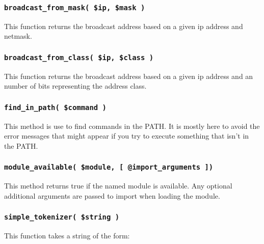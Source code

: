 \subsubsection*{\texttt{broadcast\_from\_mask( \$ip, \$mask )}\label{xPL::Base_broadcast_from_mask_ip_mask_}}


This function returns the broadcast address based on a given ip address
and netmask.

\subsubsection*{\texttt{broadcast\_from\_class( \$ip, \$class )}\label{xPL::Base_broadcast_from_class_ip_class_}}


This function returns the broadcast address based on a given ip address
and an number of bits representing the address class.

\subsubsection*{\texttt{find\_in\_path( \$command )}\label{xPL::Base_find_in_path_command_}}


This method is use to find commands in the PATH.  It is mostly
here to avoid the error messages that might appear if you try
to execute something that isn't in the PATH.

\subsubsection*{\texttt{module\_available( \$module, [ @import\_arguments ])}\label{xPL::Base_module_available_module_import_arguments_}}


This method returns true if the named module is available.
Any optional additional arguments are passed to import
when loading the module.

\subsubsection*{\texttt{simple\_tokenizer( \$string )}\label{xPL::Base_simple_tokenizer_string_}}


This function takes a string of the form:

